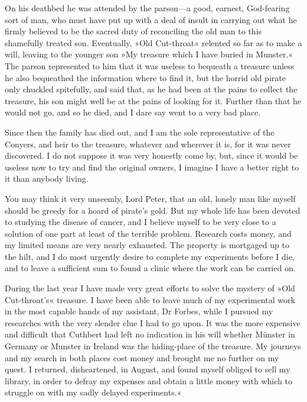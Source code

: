 On his deathbed he was attended by the parson—a good, earnest, God-fearing sort of man, who must have put up with a deal of insult in carrying out what he firmly believed to be the sacred duty of reconciling the old man to this shamefully treated son. Eventually, »Old Cut-throat« relented so far as to make a will, leaving to the younger son »My treasure which I have buried in Munster.« The parson represented to him that it was useless to bequeath a treasure unless he also bequeathed the information where to find it, but the horrid old pirate only chuckled spitefully, and said that, as he had been at the pains to collect the treasure, his son might well be at the pains of looking for it. Further than that he would not go, and so he died, and I dare say went to a very bad place.

Since then the family has died out, and I am the sole representative of the Conyers, and heir to the treasure, whatever and wherever it is, for it was never discovered. I do not suppose it was very honestly come by, but, since it would be useless now to try and find the original owners, I imagine I have a better right to it than anybody living.

You may think it very unseemly, Lord Peter, that an old, lonely man like myself should be greedy for a hoard of pirate's gold. But my whole life has been devoted to studying the disease of cancer, and I believe myself to be very close to a solution of one part at least of the terrible problem. Research costs money, and my limited means are very nearly exhausted. The property is mortgaged up to the hilt, and I do most urgently desire to complete my experiments before I die, and to leave a sufficient sum to found a clinic where the work can be carried on.

During the last year I have made very great efforts to solve the mystery of »Old Cut-throat's« treasure. I have been able to leave much of my experimental work in the most capable hands of my assistant, Dr Forbes, while I pursued my researches with the very slender clue I had to go upon. It was the more expensive and difficult that Cuthbert had left no indication in his will whether Münster in Germany or Munster in Ireland was the hiding-place of the treasure. My journeys and my search in both places cost money and brought me no further on my quest. I returned, disheartened, in August, and found myself obliged to sell my library, in order to defray my expenses and obtain a little money with which to struggle on with my sadly delayed experiments.«

